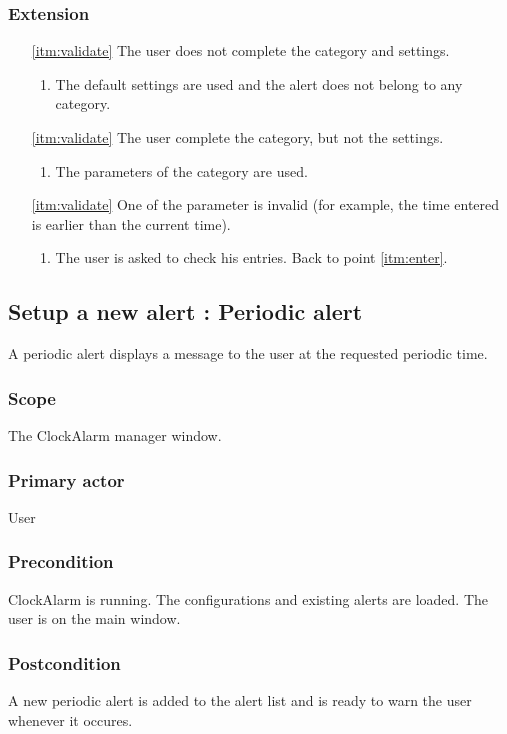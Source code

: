 \subsubsection{Extension}
\begin{enumerate}
	\item[\ref{itm:validate}] The user does not complete the category and settings.
	\begin{enumerate}[i]
		\item The default settings are used and the alert does not belong to any category.
	\end{enumerate}
	\item[\ref{itm:validate}] The user complete the category, but not the settings.
	\begin{enumerate}[i]
		\item The parameters of the category are used.
	\end{enumerate}
	\item[\ref{itm:validate}] One of the parameter is invalid (for example, the time entered is earlier than the current time).
	\begin{enumerate}[i]
		\item The user is asked to check his entries. Back to point \ref{itm:enter}.
	\end{enumerate}
\end{enumerate}

\subsection{Setup a new alert : Periodic alert}
A periodic alert displays a message to the user at the requested periodic time.
\subsubsection{Scope}
The ClockAlarm manager window.
\subsubsection{Primary actor}
User
\subsubsection{Precondition}
ClockAlarm is running. The configurations and existing alerts are loaded. The user is on the main window.
\subsubsection{Postcondition}
A new periodic alert is added to the alert list and is ready to warn the user whenever it occures.
